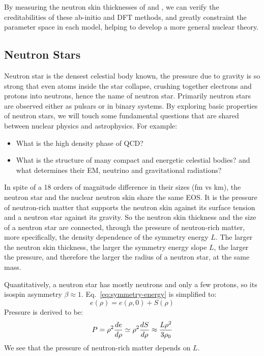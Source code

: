 \bigskip
By measuring the neutron skin thicknesses of \Pb and \Ca, we can verify the
creditabilities of these ab-initio and DFT methods, and greatly constraint the
parameter space in each model, helping to develop a more general nuclear theory.

\subsection{Neutron Stars}
Neutron star is the densest celestial body known, the pressure due to gravity is so strong
that even atoms inside the star collapse, crushing together electrons
and protons into neutrons, hence the name of neutron star. Primarily neutron
stars are observed either as pulsars or in binary systems. By exploring basic properties of
neutron stars, we will touch some fundamental questions that are shared between nuclear physics 
and astrophysics. For example:
\begin{itemize}
    \item What is the high density phase of QCD?
    \item What is the structure of many compact and energetic celestial bodies?
	and what determines their EM, neutrino and gravitational radiations?
\end{itemize}

In spite of a 18 orders of magnitude difference in their sizes (fm vs km), 
the neutron star and the nuclear neutron skin share the same EOS. 
It is the pressure of neutron-rich matter that supports the neutron skin 
against its surface tension and a neutron star against its gravity. 
So the neutron skin thickness and the size of a neutron star are connected,
through the pressure of neutron-rich matter, more specifically, the
density dependence of the symmetry energy $L$.
The larger the neutron skin thickness, the larger the symmetry energy slope $L$,
the larger the pressure, and therefore the larger the radius of a neutron star, 
at the same mass. 

Quantitatively, a neutron star has mostly neutrons and only a few protons, 
so its isospin asymmetry $\beta \approx 1$. Eq.~\ref{eq:symmetry-energy} is 
simplified to:
\begin{equation}
    e(\rho) = e(\rho, 0) + S(\rho)
\end{equation}
Pressure is derived to be:
\begin{equation}
    P = \rho^2\frac{de}{d\rho} \simeq \rho^2 \frac{dS}{d\rho} \approx \frac{L\rho^2}{3\rho_0}  \\
\end{equation}
We see that the pressure of neutron-rich matter depends on $L$. 

